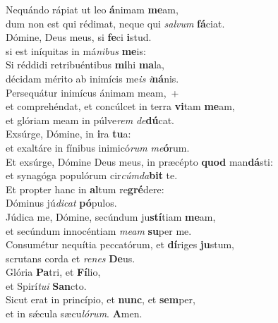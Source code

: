 \evenverse Nequándo rápiat ut leo \textbf{á}nimam \textbf{me}am,~\*\\
\evenverse dum non est qui rédimat, neque qui \textit{sal}\textit{vum} \textbf{fá}ciat.\\
\oddverse Dómine, Deus meus, si \textbf{fe}ci \textbf{i}stud.~\*\\
\oddverse si est iníquitas in má\textit{ni}\textit{bus} \textbf{me}is:\\
\evenverse Si réddidi retribuéntibus \textbf{mi}hi \textbf{ma}la,~\*\\
\evenverse décidam mérito ab inimícis me\textit{is} \textit{i}\textbf{ná}nis.\\
\oddverse Persequátur inimícus ánimam meam,~+\\
\oddverse  et comprehéndat, et concúlcet in terra \textbf{vi}tam \textbf{me}am,~\*\\
\oddverse et glóriam meam in púlve\textit{rem} \textit{de}\textbf{dú}cat.\\
\evenverse Exsúrge, Dómine, in \textbf{i}ra \textbf{tu}a:~\*\\
\evenverse et exaltáre in fínibus inimicó\textit{rum} \textit{me}\textbf{ó}rum.\\
\oddverse Et exsúrge, Dómine Deus meus, in præcépto \textbf{quod} man\textbf{dá}sti:~\*\\
\oddverse et synagóga populórum cir\textit{cúm}\textit{da}\textbf{bit} te.\\
\evenverse Et propter hanc in \textbf{al}tum re\textbf{gré}dere:~\*\\
\evenverse Dóminus jú\textit{di}\textit{cat} \textbf{pó}pulos.\\
\oddverse Júdica me, Dómine, secúndum ju\textbf{stí}tiam \textbf{me}am,~\*\\
\oddverse et secúndum innocéntiam \textit{me}\textit{am} \textbf{su}per me.\\
\evenverse Consumétur nequítia peccatórum, et \textbf{dí}riges \textbf{ju}stum,~\*\\
\evenverse scrutans corda et \textit{re}\textit{nes} \textbf{De}us.\\
\oddverse Glória \textbf{Pa}tri, et \textbf{Fí}lio,~\*\\
\oddverse et Spirí\textit{tu}\textit{i} \textbf{San}cto.\\
\evenverse Sicut erat in princípio, et \textbf{nunc}, et \textbf{sem}per,~\*\\
\evenverse et in sǽcula sæcu\textit{ló}\textit{rum}. \textbf{A}men.\\
